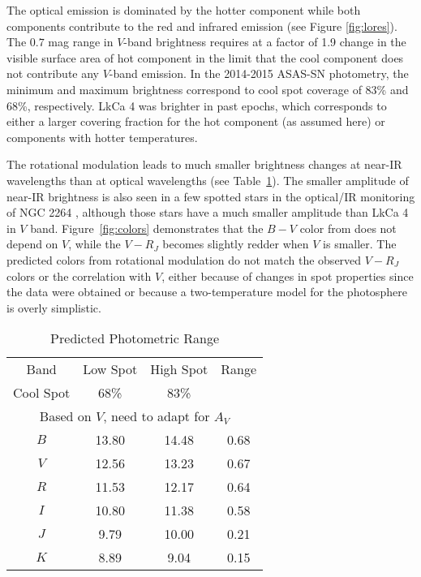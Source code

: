 \documentclass[twocolumn]{emulateapj}%
\begin{document}
The optical emission is dominated by the hotter component while both components contribute to the red and infrared emission (see Figure \ref{fig:lores}).  The $0.7$ mag range in $V$-band brightness requires at a factor of 1.9 change in the visible surface area of hot component in the limit that the cool component does not contribute any $V$-band emission.  In the 2014-2015 ASAS-SN photometry, the minimum and maximum brightness correspond to cool spot coverage of 83\% and 68\%, respectively.  LkCa 4 was brighter in past epochs, which corresponds to either a larger covering fraction for the hot component (as assumed here) or components with hotter temperatures.

The rotational modulation leads to much smaller brightness changes at near-IR wavelengths than at optical wavelengths (see Table~\ref{tab:photrange}).  The smaller amplitude of near-IR brightness is also seen in a few spotted stars in the optical/IR monitoring of NGC 2264 \citep{cody14}, although those stars have a much smaller amplitude than LkCa 4 in $V$ band.  Figure~\ref{fig:colors} demonstrates that the $B-V$ color from \citet{grankin08} does not depend on $V$, while the $V-R_J$ becomes slightly redder when $V$ is smaller.  The predicted colors from rotational modulation do not match the observed $V-R_J$ colors or the correlation with $V$, either because of changes in spot properties since the \citet{grankin08} data were obtained or because a two-temperature model for the photosphere is overly simplistic.




\begin{table}
\caption{Predicted Photometric Range}
\label{tab:photrange}
\begin{tabular}{cccc}
\hline
Band & Low Spot & High Spot & Range\\
Cool Spot & 68\% & 83\% &\\
\hline
\multicolumn{4}{c}{Based on $V$, need to adapt for $A_V$}\\
$B$ & 13.80 & 14.48 & 0.68\\
$V$ & 12.56 & 13.23 & 0.67\\
$R$ & 11.53 & 12.17 & 0.64 \\
$I$ & 10.80 & 11.38 & 0.58\\
$J$ & 9.79 & 10.00 & 0.21\\
$K$ & 8.89 & 9.04 & 0.15\\
\hline
\end{tabular}
\end{table}
\end{document}
